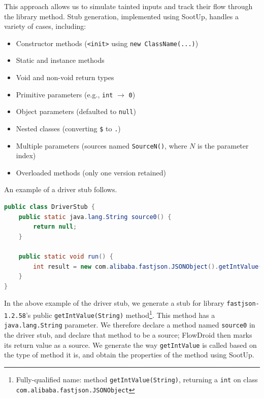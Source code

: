This approach allows us to simulate tainted inputs and track their flow through the library method. Stub generation, implemented using SootUp, handles a variety of cases, including:
\begin{itemize}
  \item Constructor methods (\texttt{<init>} using \texttt{new ClassName(...)})
  \item Static and instance methods
  \item Void and non-void return types
  \item Primitive parameters (e.g., \texttt{int} $\rightarrow$ \texttt{0})
  \item Object parameters (defaulted to \texttt{null})
  \item Nested classes (converting \texttt{\$} to \texttt{.})
  \item Multiple parameters (sources named \texttt{SourceN()}, where $N$ is the parameter index)
  \item Overloaded methods (only one version retained)
\end{itemize}

An example of a driver stub follows.
\begin{lstlisting}[language=Java]
public class DriverStub {
    public static java.lang.String source0() {
        return null;
    }

    public static void run() {
        int result = new com.alibaba.fastjson.JSONObject().getIntValue(source0());
    }
}
\end{lstlisting}

In the above example of the driver stub, we generate a stub for library \texttt{fastjson-1.2.58}'s public \texttt{getIntValue(String)} method\footnote{Fully-qualified name: method \texttt{getIntValue(String)}, returning a \texttt{int} on class \texttt{com.alibaba.fastjson.JSONObject}}. This method has a \texttt{java.lang.String} parameter. We therefore declare a method named \texttt{source0} in the driver stub, and declare that method to be a source; FlowDroid then marks its return value as a source. We generate the way \texttt{getIntValue} is called based on the type of method it is, and obtain the properties of the method using SootUp.


